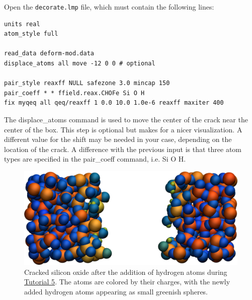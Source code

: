 \documentclass[9pt,tutorial]{livecoms}
\newcommand{\lmpcmd}[1]{\hspace{0pt}\colorbox{listing}{\textcolor{command}{\small{#1}}}\hspace{0pt}} %
\newcommand{\flecmd}[1]{\textcolor{command}{\texttt{#1}}} %
\begin{document}
Open the \flecmd{decorate.lmp} file, which must contain the following lines:
\begin{lstlisting}
units real
atom_style full

read_data deform-mod.data
displace_atoms all move -12 0 0 # optional

pair_style reaxff NULL safezone 3.0 mincap 150
pair_coeff * * ffield.reax.CHOFe Si O H
fix myqeq all qeq/reaxff 1 0.0 10.0 1.0e-6 reaxff maxiter 400
\end{lstlisting}
The \lmpcmd{displace\_atoms} command is used to move the center of the
crack near the center of the box.  This step is optional but makes for a nicer
visualization.  A different value for the shift may be needed in
your case, depending on the location of the crack.  A difference with the previous
input is that three atom types are specified in the \lmpcmd{pair\_coeff} command, i.e.
\lmpcmd{Si O H}.

\begin{figure}
\includegraphics[width=\linewidth]{SIO-decorated}
\caption{Cracked silicon oxide after the addition of hydrogen atoms
during \hyperref[reactive-silicon-dioxide-label]{Tutorial 5}.  The atoms
are colored by their charges, with the newly added hydrogen atoms appearing as small
greenish spheres.}
\label{fig:SIO-decorated}
\end{figure}
\end{document}

